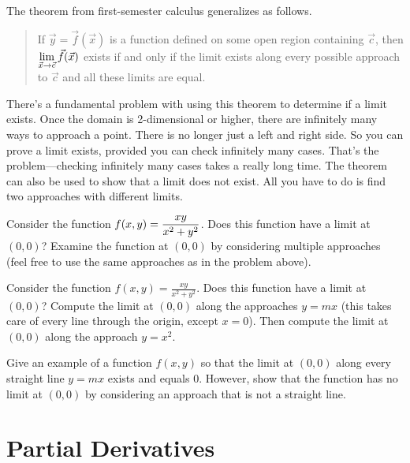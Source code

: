 The theorem from first-semester calculus generalizes as follows.
\begin{quote}
 If $\vec y=\vec f(\vec x)$ is a function defined on some open region containing $\vec c$, then $\displaystyle\lim_{\vec x\to \vec c}\vec f(\vec x)$ exists if and only if the limit exists along every possible approach to $\vec c$ and all these limits are equal.
\end{quote}
There's a fundamental problem with using this theorem to determine if a limit exists. Once the domain is 2-dimensional or higher, there are infinitely many ways to approach a point. There is no longer just a left and right side. So you can prove a limit exists, provided you can check infinitely many cases. That's the problem---checking infinitely many cases takes a really long time.  The theorem can also be used to show that a limit does not exist.  All you have to do is find two approaches with different limits.



\begin{problem}%
 Consider the function $\displaystyle f(x,y) = \frac{xy}{x^2+y^2}$.  Does this function have a limit at $(0,0)$?  Examine the function at $(0,0)$ by considering multiple approaches (feel free to use the same approaches as in the problem above). 
\end{problem}

\begin{problem}
 Consider the function $f(x,y) = \frac{xy}{x^2+y^2}$.  Does this function have a limit at $(0,0)$?  Compute the limit at $(0,0)$ along the approaches $y=mx$ (this takes care of every line through the origin, except $x=0$).  Then compute the limit at $(0,0)$ along the approach $y=x^2$.
\end{problem}

\begin{problem}[Challenge]
 Give an example of a function $f(x,y)$ so that the limit at $(0,0)$ along every straight line $y=mx$ exists and equals 0.  However, show that the function has no limit at $(0,0)$ by considering an approach that is not a straight line.
\end{problem}


\section{Partial Derivatives}

